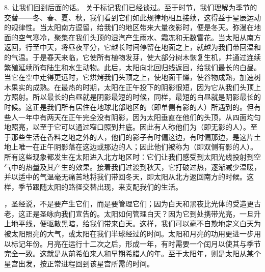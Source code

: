 8. 让我们回到后面的话。  关于标记我们已经谈过。至于时节，我们理解为季节的交替——冬、春、夏、秋，我们看到它们如此规律地相互接续，这得益于星辰运动的规律性。当太阳南方逗留，给我们的地区带来大量夜影时，便是冬天。弥漫在地面的空气寒冷，聚集在我们头顶的湿汽产生雨水、霜冻和无数雪花。当太阳从南方返回，行至中天，将昼夜平分，它越长时间停留在地面之上，就越为我们带回温和的气温。于是春天来临，它使所有植物发芽，使大部分树木恢复生机，并通过连续繁殖延续所有陆生和水生动物。此后，太阳向北回归线返回，给我们最长的白昼。当它在空中走得更远时，它烘烤我们头顶之上，使地面干燥，使谷物成熟，加速树木果实的成熟。在最热的时期，太阳在正午投下的阴影很短，因为它从我们头顶上方照射。所以最长的白昼就是阴影最短的时候，同样，最短的白昼就是阴影最长的时候。这正是我们所有居住在地球北部地区的（即单侧有影的人）所遇到的。但有些人一年中有两天在正午完全没有阴影，因为太阳垂直在他们的头顶，从四面均匀地照亮，以至于它可以通过窄口照到井底。因此有人称他们为（即无影的人）。至于那些生活在香料之地之外的人，他们的影子有时偏这边，有时偏那边，是这片土地上唯一在正午阴影落在这边或那边的人；因此他们被称为（即双侧有影的人）。所有这些现象都发生在太阳进入北方地区时：它们让我们感受到太阳光线投射到空气中的热量及其产生的效果。接着我们过渡到秋天，它打破过热，逐渐减少温暖，并以适中的气温毫无痛苦地将我们带回冬天，即太阳从北方返回南方的时候。这样，季节跟随太阳的路径交替出现，来支配我们的生活。\par

 ，圣经说，不是要产生它们，而是要管理它们；因为白天和黑夜比光体的受造更古老，这正是圣咏向我们宣告的。太阳如何管理白天？因为它到处携带光亮，一旦升上地平线，便驱散黑暗，给我们带来白天。这样，我们可以毫不自欺地定义白天为被太阳照亮的大气，或太阳在我们半球经过的时间。太阳和月亮的功用更进一步用以标记年份。月亮在运行十二次之后，形成一年，有时需要一个闰月以使其与季节完全一致。这就是从前希伯来人和早期希腊人的年。至于太阳年，则是太阳从某个星宫出发，按正常进程回到该星宫所需的时间。\par

